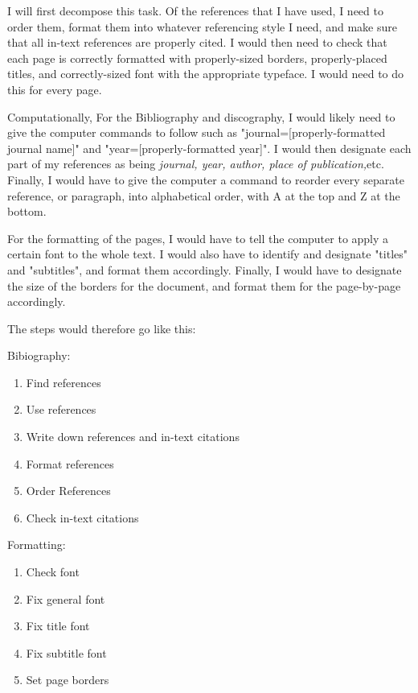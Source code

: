 \documentclass{article}
\begin{document}
I will first decompose this task. Of the references that I have used, I need to order them, format them into whatever referencing style I need, and make sure that all in-text references are properly cited. I would then need to check that each page is correctly formatted with properly-sized borders, properly-placed titles, and correctly-sized font with the appropriate typeface. I would need to do this for every page.

Computationally, For the Bibliography and discography, I would likely need to give the computer commands to follow such as "journal=[properly-formatted journal name]" and "year=[properly-formatted year]". I would then designate each part of my references as being \textit{journal, year, author, place of publication,}etc. Finally, I would have to give the computer a command to reorder every separate reference, or paragraph, into alphabetical order, with A at the top and Z at the bottom.

For the formatting of the pages, I would have to tell the computer to apply a certain font to the whole text. I would also have to identify and designate "titles" and "subtitles", and format them accordingly. Finally, I would have to designate the size of the borders for the document, and format them for the page-by-page accordingly.

The steps would therefore go like this:

Bibiography:
\begin{enumerate}
\item Find references
\item Use references
\item Write down references and in-text citations
\item Format references
\item Order References
\item Check in-text citations
\end{enumerate}
Formatting:
\begin{enumerate}
\item Check font
\item Fix general font
\item Fix title font
\item Fix subtitle font
\item Set page borders
\end{enumerate}
\end{document}
